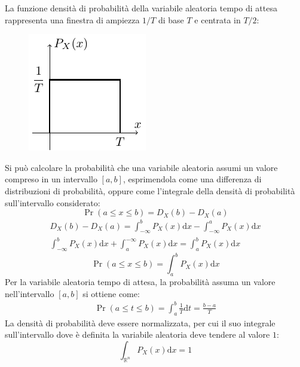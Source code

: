 \documentclass{article}
\newcommand{\df}{\mathrm{d}}
\numberwithin{equation}{subsection}
\begin{document}
La funzione densità di probabilità della variabile aleatoria tempo di attesa rappresenta una finestra di ampiezza $1/T$ di base $T$ e centrata in $T/2$:
\begin{figure}[H]%
    \centering
    \includegraphics{densità-probabilità.pdf}%
\end{figure}

Si può calcolare la probabilità che una variabile aleatoria assumi un valore compreso in un intervallo $[a,b]$, esprimendola come una differenza di distribuzioni di 
probabilità, oppure come l'integrale della densità di probabilità sull'intervallo considerato:
\begin{equation}
    \Pr(a\leq x\leq b)=D_X(b)-D_X(a)
\end{equation}
\begin{gather*}
    D_X(b)-D_X(a)=\displaystyle\int_{-\infty}^bP_X(x)\df x-\int_{-\infty}^aP_X(x)\df x\\
    \int_{-\infty}^bP_X(x)\df x+\int^{-\infty}_aP_X(x)\df x=\int_a^bP_X(x)\df x
\end{gather*}
\begin{equation}
    \Pr(a\leq x\leq b)=\displaystyle\int_a^bP_X(x)\df x
\end{equation}
Per la variabile aleatoria tempo di attesa, la probabilità assuma un valore nell'intervallo $[a,b]$ si ottiene come:
\begin{gather*}
    \Pr(a\leq t\leq b)=\displaystyle\int_a^b\frac{1}{T}\df t=\frac{b-a}{T}
\end{gather*}
La densità di probabilità deve essere normalizzata, per cui il suo integrale sull'intervallo dove è definita la variabile aleatoria deve tendere al valore $1$:
\begin{equation}
    \displaystyle\int_{\mathbb{R}^n}P_X(x)\df x=1
\end{equation}
\end{document}
